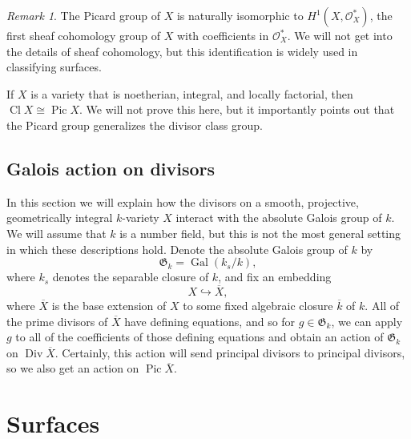 \documentclass[12pt,twoside]{reedthesis}
\theoremstyle{plain}
\theoremstyle{definition}
\theoremstyle{remark}
\newtheorem{remark}{Remark}[section]
\newcommand{\calO}{\mathcal{O}}
\newcommand{\Div}{\operatorname{Div}}
\newcommand{\Cl}{\operatorname{Cl}}
\newcommand{\Pic}{\operatorname{Pic}}
\newcommand{\Gal}{\operatorname{Gal}}
\newcommand{\GG}{\mathfrak{G}}
\begin{document}
\begin{remark}
The Picard group of $X$ is naturally isomorphic to $H^1(X,\calO_X^*)$, the first sheaf cohomology group of $X$ with coefficients in $\calO_X^*$. We will not get into the details of sheaf cohomology, but this identification is widely used in classifying surfaces.
\end{remark}
\noindent If $X$ is a variety that is noetherian, integral, and locally factorial, then $\Cl X\cong \Pic X$. We will not prove this here, but it importantly points out that the Picard group generalizes the divisor class group.
\subsection{Galois action on divisors}
In this section we will explain how the divisors on a smooth, projective, geometrically integral $k$-variety $X$ interact with the absolute Galois group of $k$. We will assume that $k$ is a number field, but this is not the most general setting in which these descriptions hold. Denote the absolute Galois group of $k$ by
\[
\GG_k=\Gal(k_s/k),
\]
where $k_s$ denotes the separable closure of $k$, and fix an embedding
\[
X\hookrightarrow \overline{X},
\]
where $\overline{X}$ is the base extension of $X$ to some fixed algebraic closure $\overline{k}$ of $k$. All of the prime divisors of $\overline{X}$ have defining equations, and so for $g\in\GG_k$, we can apply $g$ to all of the coefficients of those defining equations and obtain an action of $\GG_k$ on $\Div\overline{X}$. Certainly, this action will send principal divisors to principal divisors, so we also get an action on $\Pic \overline{X}$.
\section{Surfaces}
\end{document}
